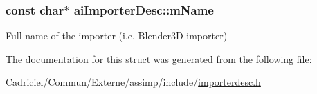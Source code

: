 \subsubsection[{\texorpdfstring{m\+Name}{mName}}]{\setlength{\rightskip}{0pt plus 5cm}const char$\ast$ ai\+Importer\+Desc\+::m\+Name}\hypertarget{structai_importer_desc_a2a9d5fd818c01bba1a0a782722ab9495}{}\label{structai_importer_desc_a2a9d5fd818c01bba1a0a782722ab9495}
Full name of the importer (i.\+e. Blender3D importer) 

The documentation for this struct was generated from the following file\+:\begin{DoxyCompactItemize}
\item 
Cadriciel/\+Commun/\+Externe/assimp/include/\hyperlink{importerdesc_8h}{importerdesc.\+h}\end{DoxyCompactItemize}
